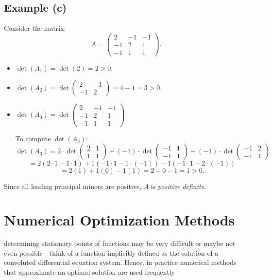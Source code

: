 \documentclass{article}
\begin{document}
\subsection*{Example (c)}
Consider the matrix:
\[
A = \begin{pmatrix}
2 & -1 & -1 \\
-1 & 2 & 1 \\
-1 & 1 & 1
\end{pmatrix}.
\]
\begin{itemize}
    \item \( \det(A_1) = \det(2) = 2 > 0 \),
    \item \( \det(A_2) = \det \begin{pmatrix} 2 & -1 \\ -1 & 2 \end{pmatrix} = 4 - 1 = 3 > 0 \),
    \item \( \det(A_3) = \det \begin{pmatrix} 2 & -1 & -1 \\ -1 & 2 & 1 \\ -1 & 1 & 1 \end{pmatrix} \).

    To compute \( \det(A_3) \):
    \[
    \det(A_3) = 2 \cdot \det \begin{pmatrix} 2 & 1 \\ 1 & 1 \end{pmatrix} - (-1) \cdot \det \begin{pmatrix} -1 & 1 \\ -1 & 1 \end{pmatrix} + (-1) \cdot \det \begin{pmatrix} -1 & 2 \\ -1 & 1 \end{pmatrix}
    \]
    \[
    = 2(2 \cdot 1 - 1 \cdot 1) + 1(-1 \cdot 1 - 1 \cdot (-1)) - 1(-1 \cdot 1 - 2 \cdot (-1))
    \]
    \[
    = 2(1) + 1(0) - 1(1) = 2 + 0 - 1 = 1 > 0.
    \]
\end{itemize}
Since all leading principal minors are positive, \( A \) is \textit{positive definite}.
\vspace{10mm}
\section{Numerical Optimization Methods}
determining stationary points of functions may be very difficult or maybe not even possible - think of a function implicitly defined as the solution of a convoluted differential equation system. Hence, in practice numerical methods that approximate an optimal solution are used frequently
\end{document}
